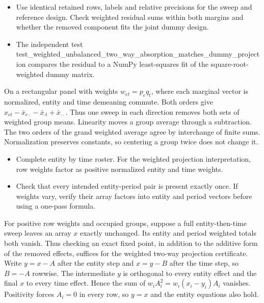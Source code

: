 \expandafter\def\csname statadic@diagnostics@STATADIC-PANEL-002\endcsname{\begin{itemize}
\item Use identical retained rows, labels and relative precisions for the sweep and reference design. Check weighted residual sums within both margins and whether the removed component fits the joint dummy design.
\item The independent test test\_weighted\_unbalanced\_two\_way\_absorption\_matches\_dummy\_projection compares the residual to a NumPy least-squares fit of the square-root-weighted dummy matrix.
\end{itemize}}
\expandafter\def\csname statadic@statement@STATADIC-PANEL-003\endcsname{On a rectangular panel with weights $w_{et}=p_eq_t$, where each
  marginal vector is normalized, entity and time demeaning commute. Both orders
  give $x_{et}-\bar x_{e\cdot}-\bar x_{\cdot t}+\bar x_{\cdot\cdot}$.
  Thus one sweep in each direction removes both sets of weighted group means.}
\expandafter\def\csname statadic@proof@STATADIC-PANEL-003\endcsname{Linearity moves a group average through a subtraction.
  The two orders of the grand weighted average agree by interchange of finite
  sums. Normalization preserves constants, so centering a group twice does
  not change it.}
\expandafter\def\csname statadic@assumptions@STATADIC-PANEL-003\endcsname{\begin{itemize}
\item Complete entity by time roster. For the weighted projection interpretation, row weights factor as positive normalized entity and time weights.
\end{itemize}}
\expandafter\def\csname statadic@diagnostics@STATADIC-PANEL-003\endcsname{\begin{itemize}
\item Check that every intended entity-period pair is present exactly once. If weights vary, verify their array factors into entity and period vectors before using a one-pass formula.
\end{itemize}}
\expandafter\def\csname statadic@statement@STATADIC-PANEL-004\endcsname{For positive row weights and occupied groups, suppose a full
  entity-then-time sweep leaves an array $x$ exactly unchanged. Its entity and
  period weighted totals both vanish. Thus checking an exact fixed point, in
  addition to the additive form of the removed effects, suffices for the
  weighted two-way projection certificate.}
\expandafter\def\csname statadic@proof@STATADIC-PANEL-004\endcsname{Write $y=x-A$ after the entity step and $x=y-B$ after the
  time step, so $B=-A$ rowwise. The intermediate $y$ is orthogonal to every
  entity effect and the final $x$ to every time effect. Hence the sum of
  $w_i A_i^2=w_i(x_i-y_i)A_i$ vanishes. Positivity forces $A_i=0$ in
  every row, so $y=x$ and the entity equations also hold.}
